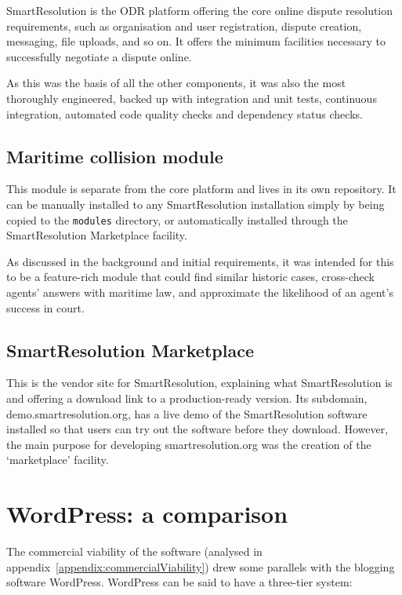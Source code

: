 SmartResolution is the ODR platform offering the core online dispute resolution requirements, such as organisation and user registration, dispute creation, messaging, file uploads, and so on. It offers the minimum facilities necessary to successfully negotiate a dispute online.

As this was the basis of all the other components, it was also the most thoroughly engineered, backed up with integration and unit tests, continuous integration, automated code quality checks and dependency status checks.

\subsection{Maritime collision module}

This module is separate from the core platform and lives in its own repository. It can be manually installed to any SmartResolution installation simply by being copied to the \lstinline{modules} directory, or automatically installed through the SmartResolution Marketplace facility.

As discussed in the background and initial requirements, it was intended for this to be a feature-rich module that could find similar historic cases, cross-check agents' answers with maritime law, and approximate the likelihood of an agent's success in court.

\subsection{SmartResolution Marketplace}

This is the vendor site for SmartResolution, explaining what SmartResolution is and offering a download link to a production-ready version. Its subdomain, demo.smartresolution.org, has a live demo of the SmartResolution software installed so that users can try out the software before they download. However, the main purpose for developing smartresolution.org was the creation of the `marketplace' facility.

\section{WordPress: a comparison}

The commercial viability of the software (analysed in appendix~\ref{appendix:commercialViability}) drew some parallels with the blogging software WordPress. WordPress can be said to have a three-tier system:

